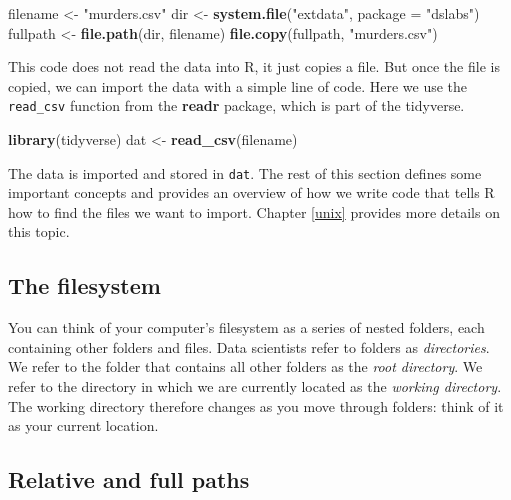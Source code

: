 \documentclass[
]{krantz}
\newenvironment{Shaded}{\begin{snugshade}}{\end{snugshade}}
\newcommand{\DataTypeTok}[1]{\textcolor[rgb]{0.27,0.27,0.27}{#1}}
\newcommand{\KeywordTok}[1]{\textcolor[rgb]{0.27,0.27,0.27}{\textbf{#1}}}
\newcommand{\NormalTok}[1]{#1}
\newcommand{\StringTok}[1]{\textcolor[rgb]{0.5,0.5,0.5}{#1}}
\begin{document}
\begin{Shaded}
\begin{Highlighting}[]
\NormalTok{filename <-}\StringTok{ "murders.csv"}
\NormalTok{dir <-}\StringTok{ }\KeywordTok{system.file}\NormalTok{(}\StringTok{"extdata"}\NormalTok{, }\DataTypeTok{package =} \StringTok{"dslabs"}\NormalTok{) }
\NormalTok{fullpath <-}\StringTok{ }\KeywordTok{file.path}\NormalTok{(dir, filename)}
\KeywordTok{file.copy}\NormalTok{(fullpath, }\StringTok{"murders.csv"}\NormalTok{)}
\end{Highlighting}
\end{Shaded}

This code does not read the data into R, it just copies a file. But once the file is copied, we can import the data with a simple line of code. Here we use the \texttt{read\_csv} function from the \textbf{readr} package, which is part of the tidyverse.

\begin{Shaded}
\begin{Highlighting}[]
\KeywordTok{library}\NormalTok{(tidyverse)}
\NormalTok{dat <-}\StringTok{ }\KeywordTok{read_csv}\NormalTok{(filename)}
\end{Highlighting}
\end{Shaded}

The data is imported and stored in \texttt{dat}. The rest of this section defines some important concepts and provides an overview of how we write code that tells R how to find the files we want to import. Chapter \ref{unix} provides more details on this topic.

\hypertarget{the-filesystem}{%
\subsection{The filesystem}\label{the-filesystem}}

You can think of your computer's filesystem as a series of nested folders, each containing other folders and files. Data scientists refer to folders as \emph{directories}. We refer to the folder that contains all other folders as the \emph{root directory}. We refer to the directory in which we are currently located as the \emph{working directory}. The working directory therefore changes as you move through folders: think of it as your current location.

\hypertarget{relative-and-full-paths}{%
\subsection{Relative and full paths}\label{relative-and-full-paths}}
\end{document}
